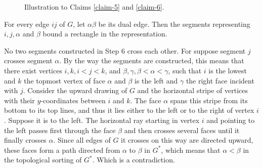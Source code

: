 \begin{figure}[!ht]
\begin{subfigure}{.25\textwidth}
	\end{subfigure}
	\begin{subfigure}{.2\textwidth}\centering
	\end{subfigure}
	\caption{Illustration to Claims \ref{claim-5} and \ref{claim-6}.}
\end{figure}

\begin{claim}
	For every edge $ij$ of $G$, let $\alpha\beta$ be its dual edge. Then the segments representing $i, j, \alpha$ and $\beta$ bound a rectangle in the representation.
	\label{claim-7}
\end{claim}

\begin{claim}
	No two segments constructed in Step 6 cross each other. For suppose segment $j$ crosses segment $\alpha$. By the way the segments are constructed, this means that there exist vertices $i, k, i < j < k$, and $\beta, \gamma, \beta < \alpha < \gamma$, such that $i$ is the lowest and $k$ the topmost vertex of face $\alpha$ and $\beta$ is the left and $\gamma$ the right face incident with $j$. Consider the upward drawing of $G$ and the horizontal stripe of vertices with their $y$-coordinates between $i$ and $k$. The face $\alpha$ spans this stripe from its bottom to its top lines, and thus it lies either to the left or to the right of vertex $i$. Suppose it is to the left. The horizontal ray starting in vertex $i$ and pointing to the left passes first through the face $\beta$ and then crosses several faces until it finally crosses $\alpha$. Since all edges of $G$ it crosses on this way are directed upward, these faces form a path directed from $\alpha$ to $\beta$ in $G^\ast$, which means that $\alpha < \beta$ in the topological sorting of $G^\ast$. Which is a contradiction.
	\label{claim-8}
\end{claim}

